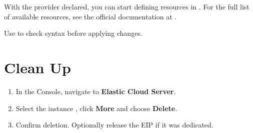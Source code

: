 \documentclass[english]{guide}
\begin{document}
With the provider declared, you can start defining resources in
. For the full list of available resources, see the official
documentation at
.

\begin{dica}
Use  to check syntax before applying changes.
\end{dica}


\section{Clean Up}

\begin{objetivos}
\end{objetivos}

\passoapasso
\begin{enumerate}
  \item In the Console, navigate to \textbf{Elastic Cloud Server}.
  \item Select the instance , click \textbf{More} and
        choose \textbf{Delete}.
  \item Confirm deletion. Optionally release the EIP if it was dedicated.
\end{enumerate}

\end{document}
